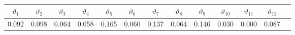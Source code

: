\begin{tabular}{ccccccccccccc}
\hline
\hline
\textbf{$\vartheta_1$} & \textbf{$\vartheta_2$} & \textbf{$\vartheta_3$} & \textbf{$\vartheta_4$} & \textbf{$\vartheta_5$} & \textbf{$\vartheta_6$} & \textbf{$\vartheta_7$} & \textbf{$\vartheta_8$} & \textbf{$\vartheta_9$} & \textbf{$\vartheta_{10}$} & \textbf{$\vartheta_{11}$} & \textbf{$\vartheta_{12}$} \\
\hline
0.092 & 0.098 & 0.064 & 0.058 & 0.165 & 0.060 & 0.137 & 0.064 & 0.146 & 0.030 & 0.000 & 0.087 \\
\hline
\end{tabular}
